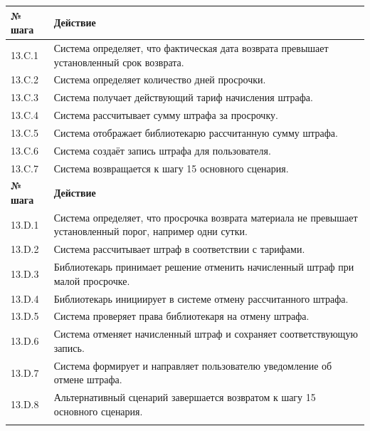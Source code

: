 \documentclass[12pt,a4paper]{article}
\begin{document}
\begin{xltabular}{\textwidth}{
				|>{\raggedright\arraybackslash}p{2.7cm}
				|>{\raggedright\arraybackslash}X|
			}
			
			\textbf{№ шага} & \textbf{Действие} \\
			\hline
			
			13.C.1 & Система определяет, что фактическая дата возврата превышает
			установленный срок возврата. \\
			\hline
			13.C.2 & Система определяет количество дней просрочки. \\
			\hline
			13.C.3 & Система получает действующий тариф начисления штрафа. \\
			\hline
			13.C.4 & Система рассчитывает сумму штрафа за просрочку. \\
			\hline
			13.C.5 & Система отображает библиотекарю рассчитанную сумму штрафа. \\
			\hline
			13.C.6 & Система создаёт запись штрафа для пользователя. \\
			\hline
			13.C.7 & Система возвращается к шагу 15 основного сценария. \\
			\hline
			
			
			\textbf{№ шага} & \textbf{Действие} \\
			\hline
			
			13.D.1 & Система определяет, что просрочка возврата материала не превышает
			установленный порог, например одни сутки. \\
			\hline
			13.D.2 & Система рассчитывает штраф в соответствии с тарифами. \\
			\hline
			13.D.3 & Библиотекарь принимает решение отменить начисленный штраф при
			малой просрочке. \\
			\hline
			13.D.4 & Библиотекарь инициирует в системе отмену рассчитанного штрафа. \\
			\hline
			13.D.5 & Система проверяет права библиотекаря на отмену штрафа. \\
			\hline
			13.D.6 & Система отменяет начисленный штраф и сохраняет соответствующую
			запись. \\
			\hline
			13.D.7 & Система формирует и направляет пользователю уведомление об отмене
			штрафа. \\
			\hline
			13.D.8 & Альтернативный сценарий завершается возвратом к шагу 15 основного
			сценария. \\
			\hline
			
			

\end{xltabular}
\end{document}
